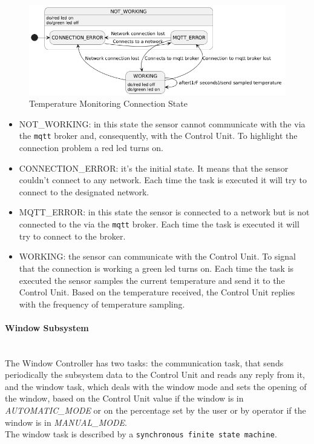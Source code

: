 \documentclass[a4paper,12pt]{report}
\begin{document}
            \begin{figure}[H]
                \centering{}
                \includegraphics[width=\textwidth]{uml/img/TemperatureCommunicationUML.png}
                \caption{Temperature Monitoring Connection State}
                \label{img:connection_state}
            \end{figure}

            \begin{itemize}
                \item NOT\_WORKING: in this state the sensor cannot communicate with the via the \texttt{mqtt} broker and, consequently, with the Control 
                Unit. To highlight the connection problem a red led turns on.
                \item CONNECTION\_ERROR: it's the initial state. It means that the sensor couldn't connect to any network. Each time the 
                task is executed it will try to connect to the designated network.
                \item MQTT\_ERROR: in this state the sensor is connected to a network but is not connected to the via the \texttt{mqtt} broker. Each time 
                the task is executed it will try to connect to the broker.
                \item WORKING: the sensor can communicate with the Control Unit. To signal that the connection is working a green led turns on. Each time 
                the task is executed the sensor samples the current temperature and send it to the Control Unit. 
                Based on the temperature received, the Control Unit replies with the frequency of temperature sampling.
            \end{itemize}

        \newpage
        \paragraph{Window Subsystem\\}
            \ \\
            The Window Controller has two tasks: the communication task, that sends periodically the subsystem data to the Control Unit 
            and reads any reply from it, and the window task, which deals with the window mode and sets the opening of the window, based on 
            the Control Unit value if the window is in \textit{AUTOMATIC\_MODE} or on the percentage set by the user or by operator if the window is in 
            \textit{MANUAL\_MODE}.\\
            The window task is described by a \texttt{synchronous finite state machine}.
\end{document}
